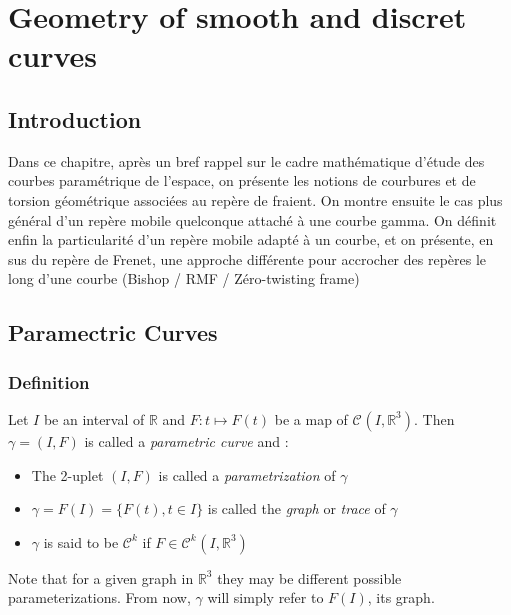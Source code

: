 \chapter{Geometry of smooth and discret curves}
\section{Introduction}
Dans ce chapitre, après un bref rappel sur le cadre mathématique d'étude des courbes paramétrique de l'espace, on présente les notions de courbures et de torsion géométrique associées au repère de fraient. On montre ensuite le cas plus général d'un repère mobile quelconque attaché à une courbe gamma. On définit enfin la particularité d'un repère mobile adapté à un courbe, et on présente, en sus du repère de Frenet, une approche différente pour accrocher des repères le long d'une courbe (Bishop / RMF / Zéro-twisting frame)



\section{Paramectric Curves}

\subsection{Definition}
Let $I$ be an interval \cite{Bishop1975} of $\mathbb{R}$ and $F\colon t \mapsto F(t)$ be a map of ${\mathcal{C}}^{}(I,{\mathbb{R}}^3)$. Then $\gamma=(I,F)$ is called a \emph{parametric curve} and :
\begin{itemize}
\item The 2-uplet $(I,F)$ is called a \emph{parametrization} of $\gamma$
\item $\gamma = F(I) = \{F(t), t \in I\}$ is called the \emph{graph} or \emph{trace} of $\gamma$
\item $\gamma$ is said to be ${\mathcal{C}}^{k}$ if $F \in {\mathcal{C}^{k}}^{}(I,{\mathbb{R}}^3)$
\end{itemize}
\smallskip
\begin{myrk}
Note that for a given graph in ${\mathbb{R}}^3$ they may be different possible parameterizations. From now, $\gamma$ will simply refer to $F(I)$, its graph.
\end{myrk}

